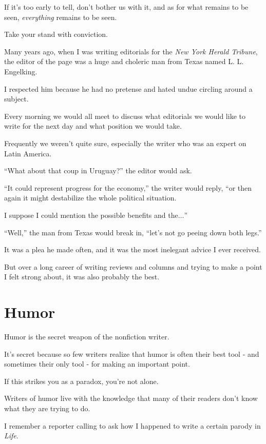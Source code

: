 \documentclass{book}
\numberwithin{equation}{section}
\begin{document}
If it's too early to tell, don't bother us with it, and as for what remains to be seen, \textit{everything} remains to be seen.

Take your stand with conviction.

%
Many years ago, when I was writing editorials for the \textit{New York Herald Tribune}, the editor of the page was a huge and choleric man from Texas named L. L. Engelking.

I respected him because he had no pretense and hated undue circling around a subject.

Every morning we would all meet to discuss what editorials we would like to write for the next day and what position we would take.

Frequently we weren't quite sure, especially the writer who was an expert on Latin America.

``What about that coup in Uruguay?'' the editor would ask.

``It could represent progress for the economy,'' the writer would reply, ``or then again it might destabilize the whole political situation.

I suppose I could mention the possible benefits and the$\ldots$''

%
``Well,'' the man from Texas would break in, ``let's not go peeing down both legs.''

It was a plea he made often, and it was the most inelegant advice I ever received.

But over a long career of writing reviews and columns and trying to make a point I felt strong about, it was also probably the best.


\chapter{Humor}

Humor is the secret weapon of the nonfiction writer.

It's secret because so few writers realize that humor is often their best tool - and sometimes their only tool - for making an important point.

%
If this strikes you as a paradox, you're not alone.

Writers of humor live with the knowledge that many of their readers don't know what they are trying to do.

I remember a reporter calling to ask how I happened to write a certain parody in \textit{Life}.
\end{document}
